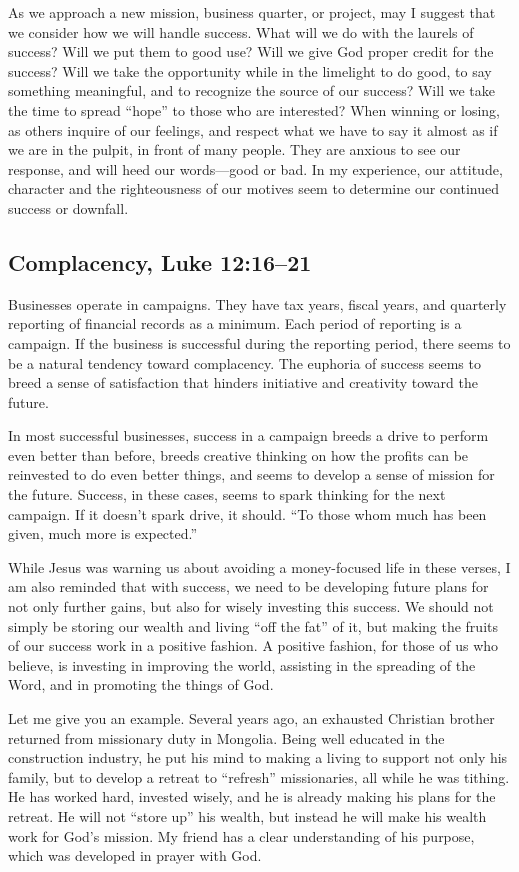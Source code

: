\documentclass[12pt]{memoir}
\begin{document}
As we approach a new mission, business quarter, or project, may I
suggest that we consider how we will handle success. What will we
do with the laurels of success? Will we put them to good use? Will
we give God proper credit for the success? Will we take the opportunity
while in the limelight to do good, to say something meaningful, and
to recognize the source of our success? Will we take the time to spread
``hope'' to those who are interested? When winning or losing, as
others inquire of our feelings, and respect what we have to say it
almost as if we are in the pulpit, in front of many people. They are
anxious to see our response, and will heed our words---good or bad.
In my experience, our attitude, character and the righteousness of
our motives seem to determine our continued success or downfall.

\subsection{Complacency, Luke 12:16--21}

Businesses operate in campaigns. They have tax years, fiscal years,
and quarterly reporting of financial records as a minimum. Each period
of reporting is a campaign. If the business is successful during the
reporting period, there seems to be a natural tendency toward complacency.
The euphoria of success seems to breed a sense of satisfaction that
hinders initiative and creativity toward the future.

In most successful businesses, success in a campaign breeds a drive
to perform even better than before, breeds creative thinking on how
the profits can be reinvested to do even better things, and seems
to develop a sense of mission for the future. Success, in these cases,
seems to spark thinking for the next campaign. If it doesn't spark
drive, it should. ``To those whom much has been given, much more
is expected.''

While Jesus was warning us about avoiding a money-focused life in
these verses, I am also reminded that with success, we need to be
developing future plans for not only further gains, but also for wisely
investing this success. We should not simply be storing our wealth
and living ``off the fat'' of it, but making the fruits of our success
work in a positive fashion. A positive fashion, for those of us who
believe, is investing in improving the world, assisting in the spreading
of the Word, and in promoting the things of God.

Let me give you an example. Several years ago, an exhausted Christian
brother returned from missionary duty in Mongolia. Being well educated
in the construction industry, he put his mind to making a living to
support not only his family, but to develop a retreat to ``refresh''
missionaries, all while he was tithing. He has worked hard, invested
wisely, and he is already making his plans for the retreat. He will
not ``store up'' his wealth, but instead he will make his wealth
work for God's mission. My friend has a clear understanding of his
purpose, which was developed in prayer with God. 
\end{document}
